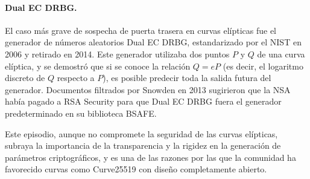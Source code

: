 \paragraph{Dual EC DRBG.}
El caso más grave de sospecha de puerta trasera en curvas elípticas fue el generador de números aleatorios Dual EC DRBG, estandarizado por el NIST en 2006 y retirado en 2014. Este generador utilizaba dos puntos $P$ y $Q$ de una curva elíptica, y se demostró \cite{shumow2007dual-ec} que si se conoce la relación $Q = eP$ (es decir, el logaritmo discreto de $Q$ respecto a $P$), es posible predecir toda la salida futura del generador. Documentos filtrados por Snowden en 2013 sugirieron que la NSA había pagado a RSA Security para que Dual EC DRBG fuera el generador predeterminado en su biblioteca BSAFE.

Este episodio, aunque no compromete la seguridad de las curvas elípticas, subraya la importancia de la transparencia y la rigidez en la generación de parámetros criptográficos, y es una de las razones por las que la comunidad ha favorecido curvas como Curve25519 con diseño completamente abierto.